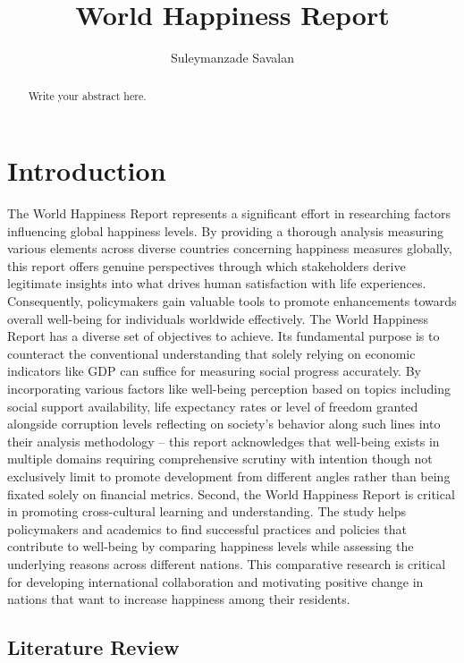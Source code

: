 \documentclass[
  12pt,
]{article}
\title{World Happiness Report}
\author{Suleymanzade Savalan}
\date{}
\begin{document}
\maketitle
\begin{abstract}
Write your abstract here.
\end{abstract}

\hypertarget{introduction}{%
\section{Introduction}\label{introduction}}

The World Happiness Report represents a significant effort in researching factors influencing global happiness levels. By providing a thorough analysis measuring various elements across diverse countries concerning happiness measures globally, this report offers genuine perspectives through which stakeholders derive legitimate insights into what drives human satisfaction with life experiences. Consequently, policymakers gain valuable tools to promote enhancements towards overall well-being for individuals worldwide effectively.
The World Happiness Report has a diverse set of objectives to achieve. Its fundamental purpose is to counteract the conventional understanding that solely relying on economic indicators like GDP can suffice for measuring social progress accurately. By incorporating various factors like well-being perception based on topics including social support availability, life expectancy rates or level of freedom granted alongside corruption levels reflecting on society's behavior along such lines into their analysis methodology -- this report acknowledges that well-being exists in multiple domains requiring comprehensive scrutiny with intention though not exclusively limit to promote development from different angles rather than being fixated solely on financial metrics.
Second, the World Happiness Report is critical in promoting cross-cultural learning and understanding. The study helps policymakers and academics to find successful practices and policies that contribute to well-being by comparing happiness levels while assessing the underlying reasons across different nations. This comparative research is critical for developing international collaboration and motivating positive change in nations that want to increase happiness among their residents.

\hypertarget{literature-review}{%
\subsection{Literature Review}\label{literature-review}}
\end{document}
